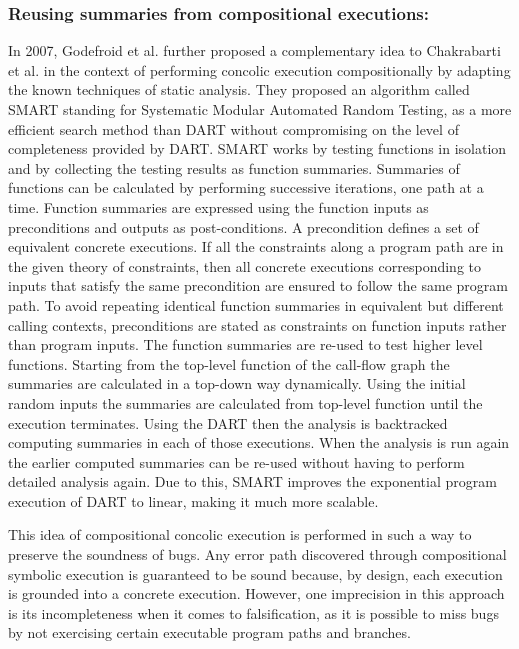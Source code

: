 \documentclass[ runningheads,
               a4paper]{llncs}
\begin{document}
\subsubsection{Reusing summaries from compositional executions:}
In 2007, Godefroid et al. \cite{godefroid2007compositional} further proposed a complementary idea \cite{godefroid2007compositional} to Chakrabarti et al. \cite{chakrabarti2006software} in the context of performing concolic execution compositionally by adapting the known techniques of static analysis. They proposed an algorithm called SMART standing for Systematic Modular Automated Random Testing, as a more efficient search method than DART \cite{godefroid2005dart} without compromising on the level of completeness provided by DART. SMART works by testing functions in isolation and by collecting the testing results as function summaries. Summaries of functions can be calculated by performing successive iterations, one path at a time. Function summaries are expressed using the function inputs as preconditions and outputs as post-conditions. A precondition defines a set of equivalent concrete executions. If all the constraints along a program path are in the given theory of constraints, then all concrete executions corresponding to inputs that satisfy the same precondition are ensured to follow the same program path. To avoid repeating identical function summaries in equivalent but different calling contexts, preconditions are stated as constraints on function inputs rather than program inputs. The function summaries are re-used to test higher level functions. Starting from the top-level function of the call-flow graph the summaries are calculated in a top-down way dynamically. Using the initial random inputs the summaries are calculated from top-level function until the execution terminates. Using the DART then the analysis is backtracked computing summaries in each of those executions. When the analysis is run again the earlier computed summaries can be re-used without having to perform detailed analysis again. Due to this, SMART improves the exponential program execution of DART to linear, making it much more scalable.

This idea of compositional concolic execution is performed in such a way to preserve the soundness of bugs. Any error path discovered through compositional symbolic execution is guaranteed to be sound because, by design, each execution is grounded into a concrete execution. However, one imprecision in this approach is its incompleteness when it comes to falsification, as it is possible to miss bugs by not exercising certain executable program paths and branches.
\end{document}
